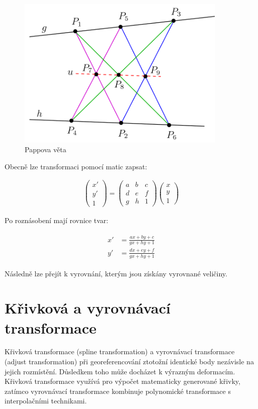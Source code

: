 \documentclass[thesis=M,czech]{FITthesis}[2012/06/26]
\begin{document}
\begin{figure}[h!]
	\centering
	\includegraphics[width=10cm]{pics/papova_veta.png}
	\caption{Pappova věta}
	\label{obrazek:pap}
\end{figure}


Obecně lze transformaci pomocí matic zapsat:

\begin{align} \label{proj_obec}
\begin{pmatrix}
x'\\ 
y'\\ 
1
\end{pmatrix} = 
\begin{pmatrix}
a & b & c\\ 
d & e & f\\ 
g & h & 1
\end{pmatrix} 
\begin{pmatrix}
x\\ 
y\\ 
1
\end{pmatrix}
\end{align}

Po roznásobení mají rovnice tvar:


\begin{align} \label{proj_roz}
\begin{split}
x' &= \frac{ax + by + c}{gx + hy + 1} \\
y' &=\frac{dx + ey + f}{gx + hy + 1}
\end{split}
\end{align}

Následně lze přejít k vyrovnání, kterým jsou získány vyrovnané veličiny.

\section{Křivková a vyrovnávací transformace}
Křivková transformace (spline transformation) a vyrovnávací transformace (adjust transformation) při georeferencování ztotožní identické body nezávisle na jejich rozmístění. Důsledkem toho může docházet k výrazným deformacím. Křivková transformace využívá pro výpočet matematicky generované křivky, zatímco vyrovnávací transformace kombinuje polynomické transformace s interpolačními technikami. 
\end{document}

